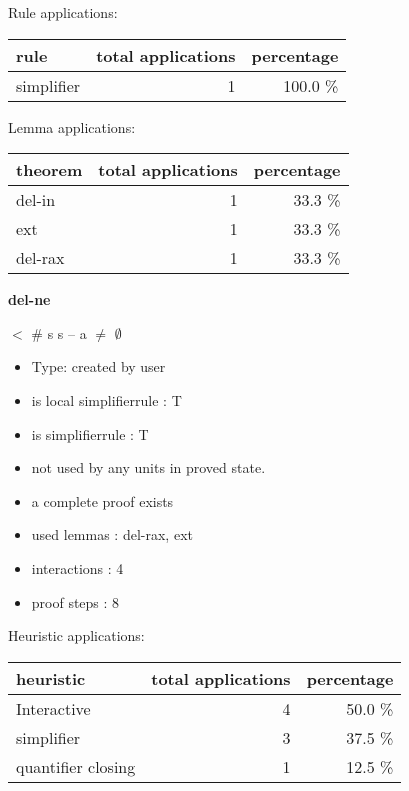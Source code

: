 \documentclass[a4paper]{article}
\begin{document}
Rule applications:

\begin{supertabular}{l|r|r}
rule	        & total applications & percentage \\ \hline
simplifier & 1 & 100.0 \% \\

\end{supertabular}

Lemma applications:

\begin{supertabular}{l|r|r}
theorem	        & total applications & percentage \\ \hline
del-in & 1 & 33.3 \% \\
ext & 1 & 33.3 \% \\
del-rax & 1 & 33.3 \% \\

\end{supertabular}
\pagebreak

{\LARGE\bf del-ne}\label{lemma-del-ne}

\medskip

  $<$ \# s \Imp s -- a $\neq$ $\emptyset$

\begin{itemize}

\item Type: created by user

\item is local simplifierrule : T
\item is simplifierrule : T
\item not used by any units in proved state.
\item       a complete proof exists
\item       used lemmas  : del-rax, ext
\item       interactions : 4
\item       proof steps  : 8
\end{itemize}

\medskip


Heuristic applications:

\begin{supertabular}{l|r|r}
heuristic	& total applications & percentage \\ \hline
Interactive & 4 & 50.0 \% \\
simplifier & 3 & 37.5 \% \\
quantifier closing & 1 & 12.5 \% \\

\end{supertabular}
\end{document}
